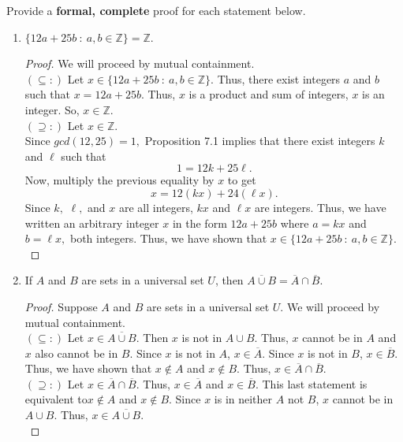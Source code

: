 \documentclass[12pt]{article}
\newcommand{\Z}{\mathbb{Z}}
\newcommand{\se}{\subseteq}
\newcommand{\spe}{\supseteq}
\begin{document}
Provide a \textbf{formal, complete} proof for each statement below.
\begin{enumerate}
\item $\{12a+25b \: : \: a,b \in \Z\} = \Z.$

\begin{proof} We will proceed by mutual containment.\\

$(\se :)$ Let $x \in \{12a+25b \: : \: a,b \in \Z\}.$ Thus, there exist integers $a$ and $b$ such that $x=12a+25b.$ Thus, $x$ is a product and sum of integers, $x$ is an integer. So, $x \in \Z.$ \\

$(\spe :)$ Let $x \in \Z.$\\
Since $gcd(12,25)=1,$ Proposition 7.1 implies that there exist integers $k$ and $\ell$ such that $$1=12k+25\ell.$$ Now, multiply the previous equality by $x$ to get $$x=12(kx) + 24(\ell x ).$$ Since $k,$ $\ell,$ and $x$ are all integers, $kx$ and $\ell x$ are integers. Thus, we have written an arbitrary integer $x$ in the form $12a + 25b$ where $a=kx$ and $b=\ell x,$ both integers. Thus, we have shown that $x \in   \{12a+25b \: : \: a,b \in \Z\}.$ \end{proof}

\vfill

\item If $A$ and $B$ are sets in a universal set $U$, then $\overline{A \cup B}=\overline{A} \cap \overline{B}.$ 

\begin{proof} Suppose $A$ and $B$ are sets in a universal set $U.$ We will proceed by mutual containment.\\

$(\se :)$ Let $x \in \overline{A \cup B}.$ Then $x$ is not in $A \cup B.$ Thus, $x$ cannot be in $A$ and $x$ also cannot be in $B.$ Since $x$ is not in $A$, $x \in \overline{A}.$ Since $x$ is not in $B$, $x \in \overline{B}.$ Thus, we have shown that $x \not \in A$ and $x \not \in B.$ Thus, $x \in \overline{A} \cap \overline{B}.$  \\

$(\spe :)$ Let $x \in \overline{A} \cap \overline{B}.$ Thus, $x \in \overline{A}$ and $x \in \overline{B}.$ This last statement is equivalent to$x \not \in A$ and $x \not \in B. $ Since $x$ is in neither $A$ not $B$, $x$ cannot be in $A\cup B.$ Thus, $x \in \overline{A \cup B}.$ \\
\end{proof}
\vfill


\end{enumerate}
\end{document}
